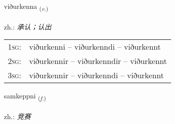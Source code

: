\documentclass[frontgrid, backgrid]{flacards}\usepackage[]{graphicx}\usepackage[]{xcolor}
\begin{document}
\renewcommand{\flhead}{\vskip5pt \fboxsep=0pt {\small\bfseries\footnotesize Sagnorð | 动词}}
\renewcommand{\fcfoot}{\vskip5pt \fboxsep=0pt \hspace{2pt}{\small\bfseries\footnotesize 1K}}

\renewcommand{\blhead}{\vskip5pt {\small\bfseries\footnotesize Sagnorð | 动词 }}
\renewcommand{\bcfoot}{\vskip5pt \hspace{2pt}{\small\bfseries\footnotesize 1K}}


{viðurkenna \small{\textsubscript{(\textit{v.})}} \\[1ex] %
 \\
zh.: \emph{承认；认出} \\  [2ex]
\renewcommand*{\arraystretch}{0.8}
\begin{tabular}{p{1cm}l}
\textsc{1sg}: & viðurkenni -- viðurkenndi -- viðurkennt \\ 
\textsc{2sg}: & viðurkennir -- viðurkenndir -- viðurkennt \\ 
\textsc{3sg}: & viðurkennir -- viðurkenndi -- viðurkennt \\ 
\end{tabular}
}

\renewcommand{\flhead}{\vskip5pt \fboxsep=0pt {\small\bfseries\footnotesize Nafnorð | 名词}}
\renewcommand{\fcfoot}{\vskip5pt \fboxsep=0pt \hspace{2pt}{\small\bfseries\footnotesize 1K}}

\renewcommand{\blhead}{\vskip5pt {\small\bfseries\footnotesize Nafnorð | 名词 }}
\renewcommand{\bcfoot}{\vskip5pt \hspace{2pt}{\small\bfseries\footnotesize 1K}}


{samkeppni \small{\textsubscript{(\textit{f.})}} \\[1ex] %
\textphonetic{[samcʰɛhpnɪ]} \\
zh.: \emph{竞赛} \\  [2ex]
\renewcommand*{\arraystretch}{0.8}
}
\end{document}
